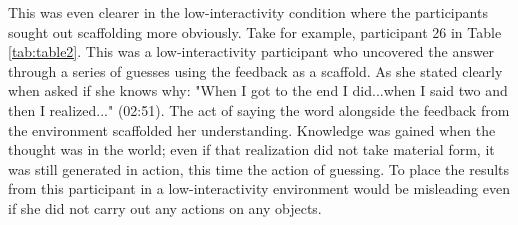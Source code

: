 \documentclass[twocolumn, serif, empirical, authordate]{jote-article}
\begin{document}
\begin{table}[ht!]
\begin{mdframed}[linecolor=jotedark]
\begin{tabularx}{\linewidth}{@{} m{.05\linewidth} m{.2\linewidth} >{\raggedleft\arraybackslash}m{.19\linewidth}  m{.05\linewidth} m{.2\linewidth} >{\raggedleft\arraybackslash}m{.19\linewidth} }
\end{tabularx} 
\vskip4pt
\end{mdframed}
\end{table}

This was even clearer in the low-interactivity condition where the participants sought out scaffolding more obviously. Take for example, participant 26 in Table \ref{tab:table2}. This was a low-interactivity participant who uncovered the answer through a series of guesses using the feedback as a scaffold. As she stated clearly when asked if she knows why: "When I got to the end I did...when I said two and then I realized..." (02:51). The act of saying the word alongside the feedback from the environment scaffolded her understanding. Knowledge was gained when the thought was in the world; even if that realization did not take material form, it was still generated in action, this time the action of guessing. To place the results from this participant in a low-interactivity environment would be misleading even if she did not carry out any actions on any objects.
\end{document}
